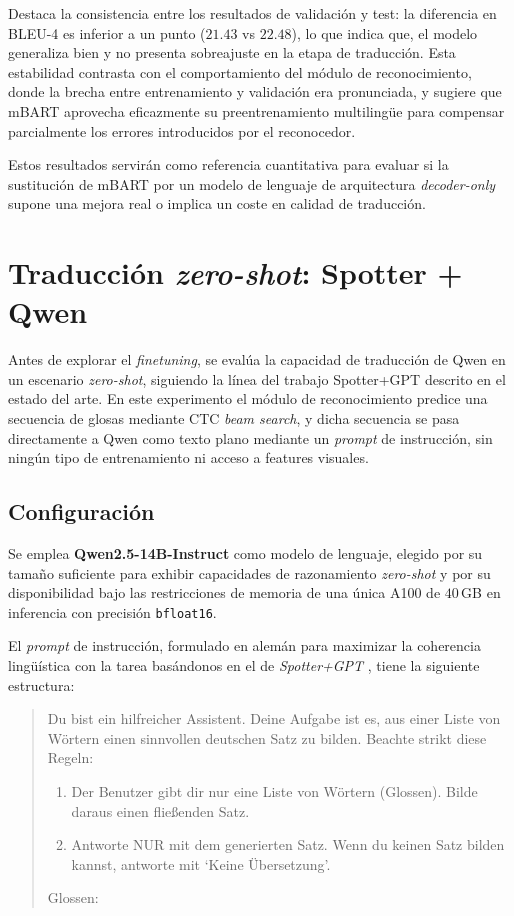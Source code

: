 Destaca la consistencia entre los resultados de validación y test: la diferencia en BLEU-4 es inferior a un punto ($21.43$ vs $22.48$), lo que indica que, el modelo generaliza bien y no presenta sobreajuste en la etapa de traducción.
Esta estabilidad contrasta con el comportamiento del módulo de reconocimiento, donde la brecha entre entrenamiento y validación era pronunciada, y sugiere que mBART aprovecha eficazmente su preentrenamiento multilingüe para compensar parcialmente los errores introducidos por el reconocedor.

Estos resultados servirán como referencia cuantitativa para evaluar si la sustitución de mBART por un modelo de lenguaje de arquitectura \textit{decoder-only} supone una mejora real o implica un coste en calidad de traducción.


\section{Traducción \textit{zero-shot}: Spotter + Qwen}\label{sec:zeroshot}

Antes de explorar el \textit{finetuning}, se evalúa la capacidad de traducción de Qwen en un escenario \textit{zero-shot}, siguiendo la línea del trabajo Spotter+GPT descrito en el estado del arte.
En este experimento el módulo de reconocimiento predice una secuencia de glosas mediante CTC \textit{beam search}, y dicha secuencia se pasa directamente a Qwen como texto plano mediante un \textit{prompt} de instrucción, sin ningún tipo de entrenamiento ni acceso a features visuales.

\subsection{Configuración}
Se emplea \textbf{Qwen2.5-14B-Instruct} como modelo de lenguaje, elegido por su tamaño suficiente para exhibir capacidades de razonamiento \textit{zero-shot} y por su disponibilidad bajo las restricciones de memoria de una única A100 de $40$\,GB en inferencia con precisión \texttt{bfloat16}.

El \textit{prompt} de instrucción, formulado en alemán para maximizar la coherencia lingüística con la tarea basándonos en el de \textit{Spotter+GPT} \cite{SpotterGPT}, tiene la siguiente estructura:
\begin{quote}
\ttfamily\small
Du bist ein hilfreicher Assistent. Deine Aufgabe ist es, aus einer Liste von Wörtern einen sinnvollen deutschen Satz zu bilden. Beachte strikt diese Regeln:
\begin{enumerate}
	 \item Der Benutzer gibt dir nur eine Liste von Wörtern (Glossen).
	 Bilde daraus einen fließenden Satz.
	\item Antworte NUR mit dem generierten Satz.
	Wenn du keinen Satz bilden kannst, antworte mit `Keine Übersetzung'.
\end{enumerate}
Glossen:
\end{quote}

